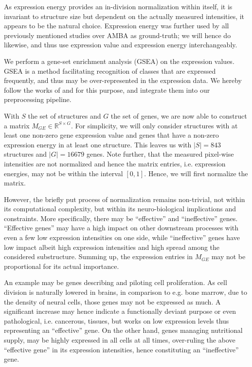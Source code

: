 \documentclass[]{article}
\begin{document}
As expression energy provides an in-division normalization within itself, it is invariant to structure size but dependent on the actually measured intensities, it appears to be the natural choice. Expression energy was further used by all previously mentioned studies over AMBA as ground-truth; we will hence do likewise, and thus use expression value and expression energy interchangeably.

We perform a gene-set enrichment analysis (GSEA) on the expression values. GSEA is a method facilitating recognition of classes that are expressed frequently, and thus may be over-represented in the expression data. We hereby follow the works of \citet{subramanian2007gsea} and \citet{kuleshov2016enrichr} for this purpose, and integrate them into our preprocessing pipeline.

With $S$ the set of structures and $G$ the set of genes, we are now able to construct a matrix $M_{GE}\in \mathbb{R}^{S\times G}$. For simplicity, we will only consider structures with at least one non-zero gene expression value and genes that have a non-zero expression energy in at least one structure. This leaves us with $|S|=843$ structures and $|G|=16679$ genes. Note further, that the measured pixel-wise intensities are not normalized and hence the matrix entries, i.e. expression energies, may not be within the interval $[0,1]$. Hence, we will first normalize the matrix. 

However, the briefly put process of normalization remains non-trivial, not within its computational complexity, but within its neuro-biological implications and constraints. More specifically, there may be ``effective'' and ``ineffective'' genes. ``Effective genes'' may have a high impact on other downstream processes with even a few low expression intensities on one side, while ``ineffective'' genes have low impact albeit high expression intensities and high spread among the considered substructure. Summing up, the expression entries in $M_{GE}$ may not be proportional for its actual importance. 

An example may be genes describing and piloting cell proliferation. As cell division is naturally lowered in brains, in comparison to e.g. bone marrow, due to the density of neural cells, those genes may not be expressed as much. A significant increase may hence indicate a functionally deviant purpose or even pathological, i.e. cancerous, tissues, but works on low expression levels thus representing an ``effective'' gene. On the other hand, genes managing nutritional supply, may be highly expressed in all cells at all times, over-ruling the above ``effective gene'' in its expression intensities, hence constituting an ``ineffective'' gene.
\end{document}
